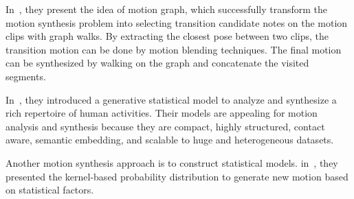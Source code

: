 In~\cite{kovar2002}, they present the idea of motion graph, which successfully transform the motion synthesis problem 
into selecting transition candidate notes on the motion clips with graph walks. 
By extracting the closest pose between two clips, the transition motion can be done by motion blending techniques.
The final motion can be synthesized by walking on the graph and concatenate the visited segments.

In~\cite{min}, they introduced a generative statistical model to analyze and
synthesize a rich repertoire of human activities. 
Their models are appealing for motion analysis and synthesis because they are compact,
highly structured, contact aware, semantic embedding, and scalable to huge and heterogeneous datasets.

Another motion synthesis approach is to construct statistical models. in~\cite{pullen2000}, they presented the kernel-based 
probability distribution to generate new motion based on statistical factors.